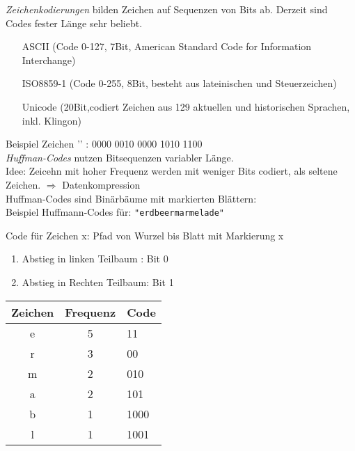 
\emph{Zeichenkodierungen} bilden Zeichen auf Sequenzen von Bits ab. Derzeit sind Codes fester Länge sehr beliebt.
\begin{enumerate}[]
\item[ASCII] (Code 0-127, 7Bit, American Standard Code for Information Interchange)
\item[ISO8859-1] (Code 0-255, 8Bit, besteht aus lateinischen und Steuerzeichen)
\item[Unicode] (20Bit,codiert Zeichen aus 129 aktuellen und historischen Sprachen, inkl. Klingon)
\end{enumerate}
Beispiel Zeichen '\EUR' : 0000 0010 0000 1010 1100
\bigskip\\
\emph{Huffman-Codes} nutzen Bitsequenzen variabler Länge.\\
Idee: Zeicehn mit hoher Frequenz werden mit weniger Bits codiert, als seltene Zeichen.
$\Rightarrow$ Datenkompression\\
Huffman-Codes sind Binärbäume mit markierten Blättern:\\
Beispiel Huffmann-Codes für: \lstinline|"erdbeermarmelade"|\\
\begin{figure}[h!]
\centering
{}
\end{figure}
Code für Zeichen x: Pfad von Wurzel bis Blatt mit Markierung x
\begin{enumerate}[-]
\item Abstieg in linken Teilbaum : Bit 0
\item Abstieg in Rechten Teilbaum: Bit 1
\end{enumerate}
\begin{table}[h!]
\centering
\begin{tabular}{ccl}
Zeichen&Frequenz&Code\\\hline
e & 5 & 11\\
r & 3 & 00\\
m & 2 & 010\\
a & 2 & 101\\
b & 1 & 1000\\
l & 1 & 1001
\end{tabular}
\end{table}
